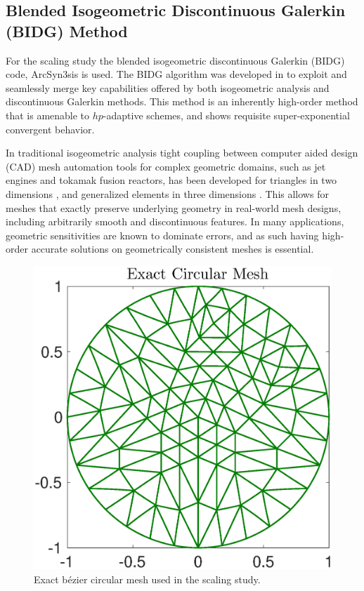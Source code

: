 \subsection{Blended Isogeometric Discontinuous Galerkin (BIDG) Method}
\label{sec:isogeometric}

For the scaling study the blended isogeometric discontinuous Galerkin (BIDG) code, ArcSyn3sis is used.  The BIDG algorithm was developed in \cite{Michoski2016658} to exploit and seamlessly merge key capabilities offered by both isogeometric analysis and discontinuous Galerkin methods. This method is an inherently high-order method that is amenable to $hp$-adaptive schemes, and shows requisite super-exponential convergent behavior.

In traditional isogeometric analysis tight coupling between computer aided design (CAD) mesh automation tools for complex geometric domains, such as jet engines and tokamak fusion reactors, has been developed for triangles in two dimensions \cite{Engvall2016378}, and generalized elements in three dimensions \cite{EngvallPress}.  This allows for meshes that exactly preserve underlying geometry in real-world mesh designs, including arbitrarily smooth and discontinuous features.  In many applications, geometric sensitivities are known to dominate errors, and as such having high-order accurate solutions on geometrically consistent meshes is essential.


\begin{figure}[h]
\begin{center}
\includegraphics[width=0.8\linewidth]{./bidg_data/168_circ}
\end{center}
\vspace*{-.5cm}
\caption{Exact b\'{e}zier circular mesh used in the scaling study.}
\label{fig:dns_scaling}
\end{figure}


